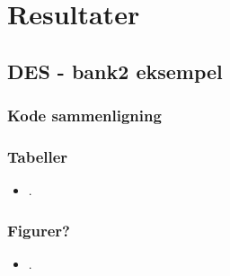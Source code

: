 \documentclass[12pt]{beamer}
\begin{document}
\section{Resultater}
\subsection{DES - bank2 eksempel}
\begin{frame}
  \frametitle{Kode sammenligning}
\end{frame}

\begin{frame}
  \frametitle{Tabeller}
  \begin{itemize}
    \item .
  \end{itemize}
\end{frame}

\begin{frame}
  \frametitle{Figurer?}
  \begin{itemize} 
    \item .
  \end{itemize}
\end{frame}
\end{document}
